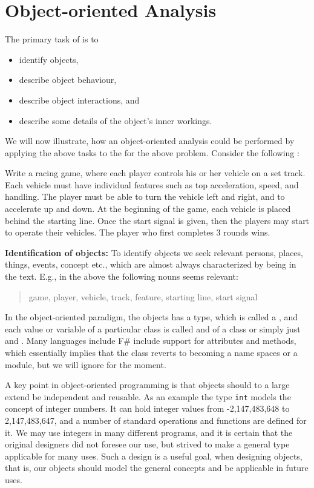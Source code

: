 \section{Object-oriented Analysis}
The primary task of  is to 
\begin{itemize}
\item identify objects,
\item describe object behaviour,
\item describe object interactions, and 
\item describe some details of the object's inner workings.
\end{itemize}
We will now illustrate, how an object-oriented analysis could be performed by applying the above tasks to the for the above problem. Consider the following :
%
\begin{problem}
  Write a racing game, where each player controls his or her vehicle on a set track. Each vehicle must have individual features such as top acceleration, speed, and handling. The player must be able to turn the vehicle left and right, and to accelerate up and down. At the beginning of the game, each vehicle is placed behind the starting line. Once the start signal is given, then the players may start to operate their vehicles. The player who first completes 3 rounds wins.
\end{problem}
%
\textbf{Identification of objects:} To identify objects we seek relevant persons, places, things, events, concept etc., which are almost always characterized by being  in the text. E.g., in the above the following nouns seems relevant: 
\begin{quote}
  game, player, vehicle, track, feature, starting line, start signal
\end{quote}
In the object-oriented paradigm, the objects has a type, which is called a , and each value or variable of a particular class is called and  of a class or simply just and . Many languages include F\# include support for  attributes and methods, which essentially implies that the class reverts to becoming a name spaces or a module, but we will ignore for the moment. 

A key point in object-oriented programming is that objects should to a large extend be independent and reusable. As an example the type \lstinline|int| models the concept of integer numbers. It can hold integer values from -2,147,483,648 to 2,147,483,647, and a number of standard operations and functions are defined for it. We may use integers in many different programs, and it is certain that the original designers did not foresee our use, but strived to make a general type applicable for many uses. Such a design is a useful goal, when designing objects, that is, our objects should model the general concepts and be applicable in future uses.

